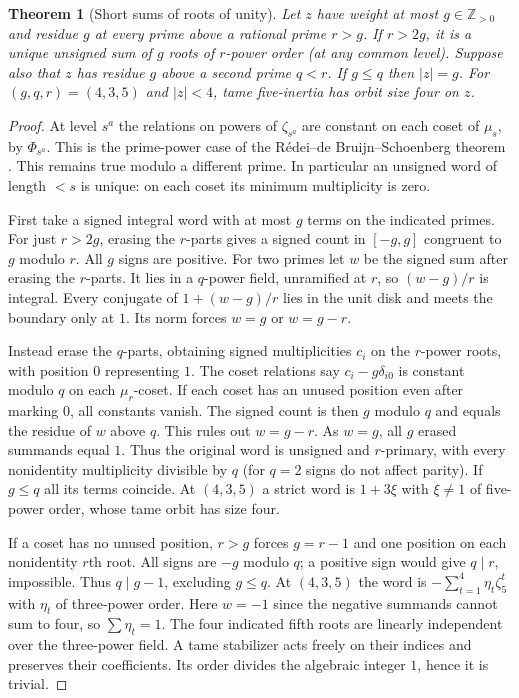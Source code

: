 \documentclass[11pt,a4paper]{article}
\numberwithin{equation}{section}
\newtheorem{theorem}{Theorem}[section]
\theoremstyle{remark}
\newcommand{\ZZ}{\mathbb Z}
\begin{document}
\begin{theorem}[Short sums of roots of unity]\label{three:word}
Let $z$ have weight at most $g\in\ZZ_{>0}$ and residue $g$ at every prime above a rational prime $r>g$.
If $r>2g$, it is a unique unsigned sum of $g$ roots of $r$-power order (at any common level).
Suppose also that $z$ has residue $g$ above a second prime $q<r$. If $g\le q$ then $|z|=g$.
For $(g,q,r)=(4,3,5)$ and $|z|<4$, tame five-inertia has orbit size four on $z$.
\end{theorem}\begin{proof}
At level $s^a$ the relations on powers of $\zeta_{s^a}$ are constant on each coset of $\mu_s$, by $\Phi_{s^a}$. This is the prime-power case of the R\'edei--de Bruijn--Schoenberg theorem \cite[Theorem~5.1]{Malikiosis}. This remains true modulo a different prime. In particular an unsigned word of length $<s$ is unique: on each coset its minimum multiplicity is zero.

First take a signed integral word with at most $g$ terms on the indicated primes. For just $r>2g$, erasing the $r$-parts gives a signed count in $[-g,g]$ congruent to $g$ modulo $r$. All $g$ signs are positive. For two primes let $w$ be the signed sum after erasing the $r$-parts. It lies in a $q$-power field, unramified at $r$, so $(w-g)/r$ is integral. Every conjugate of $1+(w-g)/r$ lies in the unit disk and meets the boundary only at $1$. Its norm forces $w=g$ or $w=g-r$.

Instead erase the $q$-parts, obtaining signed multiplicities $c_i$ on the $r$-power roots, with position $0$ representing $1$. The coset relations say $c_i-g\delta_{i0}$ is constant modulo $q$ on each $\mu_r$-coset. If each coset has an unused position even after marking $0$, all constants vanish. The signed count is then $g$ modulo $q$ and equals the residue of $w$ above $q$. This rules out $w=g-r$. As $w=g$, all $g$ erased summands equal $1$. Thus the original word is unsigned and $r$-primary, with every nonidentity multiplicity divisible by $q$ (for $q=2$ signs do not affect parity). If $g\le q$ all its terms coincide. At $(4,3,5)$ a strict word is $1+3\xi$ with $\xi\ne1$ of five-power order, whose tame orbit has size four.

If a coset has no unused position, $r>g$ forces $g=r-1$ and one position on each nonidentity $r$th root. All signs are $-g$ modulo $q$; a positive sign would give $q\mid r$, impossible. Thus $q\mid g-1$, excluding $g\le q$. At $(4,3,5)$ the word is $-\sum_{t=1}^4\eta_t\zeta_5^t$ with $\eta_t$ of three-power order. Here $w=-1$ since the negative summands cannot sum to four, so $\sum\eta_t=1$. The four indicated fifth roots are linearly independent over the three-power field. A tame stabilizer acts freely on their indices and preserves their coefficients. Its order divides the algebraic integer $1$, hence it is trivial.


\end{proof}
\end{document}

